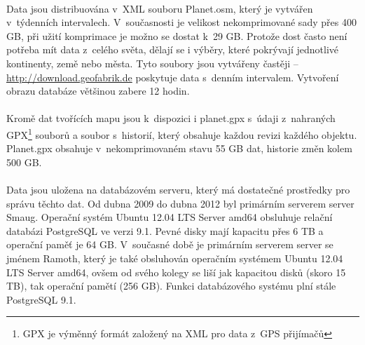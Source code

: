 \documentclass[11pt,a4paper,titlepage,oneside]{book}
\begin{document}

		\paragraph{} Data jsou distribuována v~XML souboru Planet.osm, který je vytvářen v~týdenních intervalech. V~současnosti je velikost nekomprimované sady přes 400 GB, při užití komprimace je možno se dostat k~29 GB. Protože dost často není potřeba mít data z~celého světa, dělají se i výběry, které pokrývají jednotlivé kontinenty, země nebo města. Tyto soubory jsou vytvářeny častěji -- \url{http://download.geofabrik.de} poskytuje data s~denním intervalem. Vytvoření obrazu databáze většinou zabere 12 hodin\cite{planet.osm}.


	\paragraph{} Kromě dat tvořících mapu jsou k~dispozici i planet.gpx s~údaji z~nahraných \ac{GPX}\footnote{\ac{GPX} je výměnný formát založený na \ac{XML} pro data z~GPS přijímačů} souborů a soubor s~historií, který obsahuje každou revizi každého objektu. Planet.gpx obsahuje v~nekomprimovaném stavu 55 GB dat, historie změn kolem 500 GB\cite{osm_wiki_planet.gpx}. 


	\paragraph{} Data jsou uložena na databázovém serveru, který má dostatečné prostředky pro správu těchto dat. Od dubna 2009 do dubna 2012 byl primárním serverem server Smaug\cite{osm_wiki_smaug}. Operační systém Ubuntu 12.04 LTS Server amd64 obsluhuje relační databázi PostgreSQL ve verzi 9.1. Pevné disky mají kapacitu přes 6 TB a operační paměť je 64 GB. V~současné době je primárním serverem server se jménem Ramoth\cite{osm_wiki_ramoth}, který je také obsluhován operačním systémem Ubuntu 12.04 LTS Server amd64, ovšem od svého kolegy se liší jak kapacitou disků (skoro 15 TB), tak operační pamětí (256 GB). Funkci databázového systému plní stále PostgreSQL 9.1.
\end{document}
